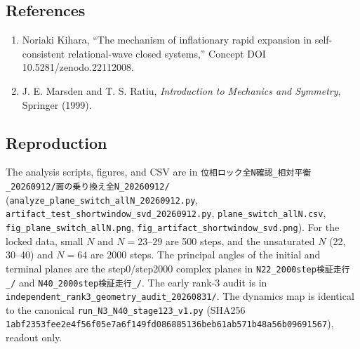 \documentclass[
  a4paper,
]{ltjsarticle}
\providecommand{\tightlist}{%
  \setlength{\itemsep}{0pt}\setlength{\parskip}{0pt}}
\begin{document}
\subsection{References}\label{references}

\begin{enumerate}
\def\labelenumi{\arabic{enumi}.}
\tightlist
\item
  Noriaki Kihara, ``The mechanism of inflationary rapid expansion in
  self-consistent relational-wave closed systems,'' Concept DOI
  10.5281/zenodo.22112008.
\item
  J. E. Marsden and T. S. Ratiu, \emph{Introduction to Mechanics and
  Symmetry}, Springer (1999).
\end{enumerate}

\subsection{Reproduction}\label{reproduction}

The analysis scripts, figures, and CSV are in
\texttt{位相ロック全N確認\_相対平衡\_20260912/面の乗り換え全N\_20260912/}
(\texttt{analyze\_plane\_switch\_allN\_20260912.py},
\texttt{artifact\_test\_shortwindow\_svd\_20260912.py},
\texttt{plane\_switch\_allN.csv}, \texttt{fig\_plane\_switch\_allN.png},
\texttt{fig\_artifact\_shortwindow\_svd.png}). For the locked data,
small \(N\) and \(N=23\)--\(29\) are 500 steps, and the unsaturated
\(N\) (22, 30--40) and \(N=64\) are 2000 steps. The principal angles of
the initial and terminal planes are the step0/step2000 complex planes in
\texttt{N22\_2000step検証走行\_/} and \texttt{N40\_2000step検証走行\_/}.
The early rank-3 audit is in
\texttt{independent\_rank3\_geometry\_audit\_20260831/}. The dynamics
map is identical to the canonical \texttt{run\_N3\_N40\_stage123\_v1.py}
(SHA256
\texttt{1abf2353fee2e4f56f05e7a6f149fd086885136beb61ab571b48a56b09691567}),
readout only.
\end{document}
